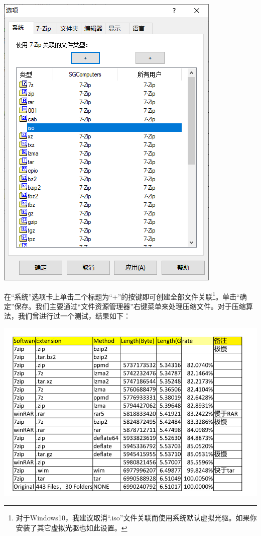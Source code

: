 \begin{center}
	\includegraphics[scale=0.7]{pic/7zopt.PNG}
\end{center} \par
在“系统”选项卡上单击二个标题为“+”的按键即可创建全部文件关联\footnote{对于Windows10，我建议取消“.iso”文件关联而使用系统默认虚拟光驱。如果你安装了其它虚拟光驱也如此设置。}。单击“确定”保存。我们主要通过“文件资源管理器”右键菜单来处理压缩文件。对于压缩算法，我们曾进行过一个测试，结果如下：
\begin{center}
\includegraphics[scale=0.55]{pic/ziprate.PNG}	
\end{center} \par
